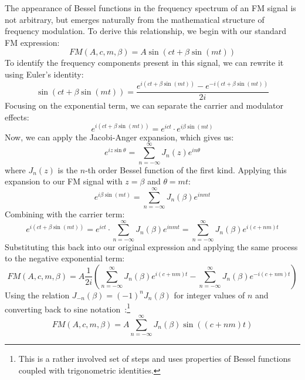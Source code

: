 \documentclass[11pt,twoside]{report}
\numberwithin{thm}{section}
\numberwithin{equation}{section}
\begin{document}
The appearance of Bessel functions in the frequency spectrum of an FM signal is not arbitrary, but emerges naturally from the mathematical structure of frequency modulation. To derive this relationship, we begin with our standard FM expression:
\begin{equation}
  FM(A, c, m, \beta) = A \sin(ct + \beta \sin(mt))  
\end{equation}
To identify the frequency components present in this signal, we can rewrite it using Euler's identity:
\begin{equation}
  \sin(ct + \beta \sin(mt)) = \frac{e^{i(ct + \beta \sin(mt))} - e^{-i(ct + \beta \sin(mt))}}{2i}  
\end{equation}
Focusing on the exponential term, we can separate the carrier and modulator effects:
\begin{equation}
    e^{i(ct + \beta \sin(mt))} = e^{ict} \cdot e^{i\beta \sin(mt)}    
\end{equation}
Now, we can apply the Jacobi-Anger expansion, which gives us:
\begin{equation}
  e^{iz\sin\theta} = \sum_{n=-\infty}^{\infty} J_n(z)e^{in\theta}  
\end{equation}
where $J_n(z)$ is the $n$-th order Bessel function of the first kind. Applying this expansion to our FM signal with $z = \beta$ and $\theta = mt$:
\begin{equation}
  e^{i\beta \sin(mt)} = \sum_{n=-\infty}^{\infty} J_n(\beta)e^{inmt}  
\end{equation}
Combining with the carrier term:
\begin{equation}
  e^{i(ct + \beta \sin(mt))} = e^{ict} \cdot \sum_{n=-\infty}^{\infty} J_n(\beta)e^{inmt} = \sum_{n=-\infty}^{\infty} J_n(\beta)e^{i(c+nm)t}
\end{equation}
Substituting this back into our original expression and applying the same process to the negative exponential term:
\begin{equation}
  FM(A, c, m, \beta) = A\frac{1}{2i}\left(\sum_{n=-\infty}^{\infty} J_n(\beta)e^{i(c+nm)t} - \sum_{n=-\infty}^{\infty} J_n(\beta)e^{-i(c+nm)t}\right)  
\end{equation}
Using the relation $J_{-n}(\beta) = (-1)^n J_n(\beta)$ for integer values of $n$ and converting back to sine notation~\cite{kreh_2012}:\footnote{This is a rather involved set of steps and uses properties of Bessel functions coupled with trigonometric identities.}
\begin{equation}
  FM(A, c, m, \beta) = A\sum_{n=-\infty}^{\infty} J_n(\beta)\sin((c+nm)t)  
\end{equation}
\end{document}
